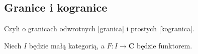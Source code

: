 \subsection{Granice i kogranice}

Czyli o granicach odwrotnych [granica] i prostych [kogranica].

%

Niech $I$ będzie małą kategorią, a $F:I\to\mathbf{C}$ będzie funktorem.

